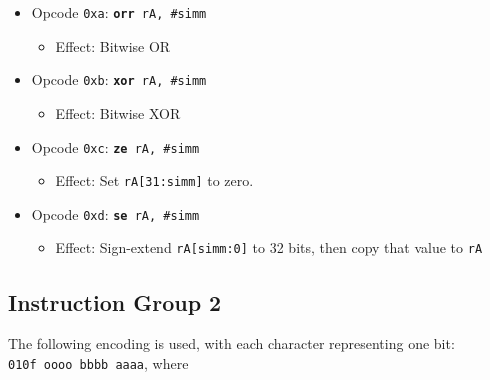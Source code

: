 \documentclass{article}
\begin{document}
\begin{itemize}
	\item Opcode \texttt{0xa}:
		\texttt{\textbf{orr} rA, \#simm}
		\begin{itemize}
		\item Effect: Bitwise OR
		\end{itemize}
	\item Opcode \texttt{0xb}:
		\texttt{\textbf{xor} rA, \#simm}
		\begin{itemize}
		\item Effect: Bitwise XOR
		\end{itemize}
	\item Opcode \texttt{0xc}:
		\texttt{\textbf{ze} rA, \#simm}
		\begin{itemize}
		\item Effect: Set \texttt{rA[31:simm]} to zero.
		\end{itemize}
	\item Opcode \texttt{0xd}:
		\texttt{\textbf{se} rA, \#simm}
		\begin{itemize}
		\item Effect:
			Sign-extend \texttt{rA[simm:0]} to 32 bits, then copy that
			value to \texttt{rA}
		\end{itemize}
	\end{itemize}

	\doublespacing

	\subsection{Instruction Group 2}
	The following encoding is used, with each character representing one
	bit: \\
	\texttt{010f oooo bbbb aaaa}, where
\end{document}
